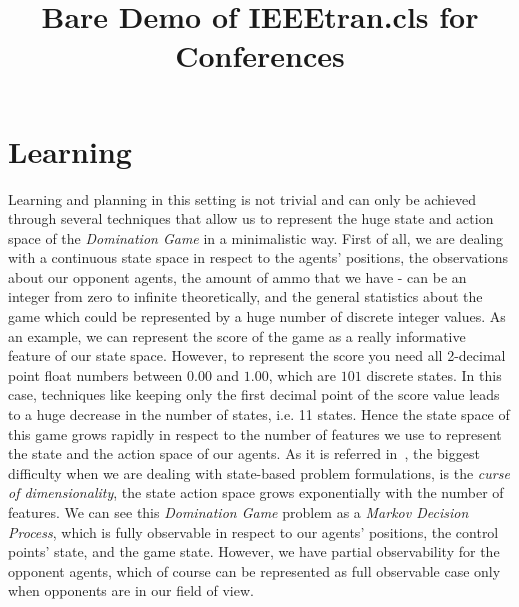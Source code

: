 \documentclass[conference]{IEEEtran}
\begin{document}
%
\title{Bare Demo of IEEEtran.cls for Conferences}


\author{
\and
{}
\and
{}
}

\IEEEpeerreviewmaketitle



\section{Learning}
Learning and planning in this setting is not trivial and can only be achieved through several techniques that allow us to represent the huge state and action space of the \textit{Domination Game} in a minimalistic way. First of all, we are dealing with a continuous state space in respect to the agents' positions, the observations about our opponent agents, the amount of ammo that we have - can be an integer from zero to infinite theoretically, and the general statistics about the game which could be represented by a huge number of discrete integer values. As an example, we can represent the score of the game as a really informative feature of our state space. However, to represent the score you need all 2-decimal point float numbers between $0.00$ and $1.00$, which are $101$ discrete states. In this case, techniques like keeping only the first decimal point of the score value leads to a huge decrease in the number of states, i.e. 11 states. Hence the state space of this game grows rapidly in respect to the number of features we use to represent the state and the action space of our agents. As it is referred in~\cite{boutilier2011decision}, the biggest difficulty when we are dealing with state-based problem formulations, is the \textit{curse of dimensionality}, the state action space grows exponentially with the number of features. We can see this \textit{Domination Game} problem as a \textit{Markov Decision Process}, which is fully observable in respect to our agents' positions, the control points' state, and the game state. However, we have partial observability for the opponent agents, which of course can be represented as full observable case only when opponents are in our field of view.
\end{document}
